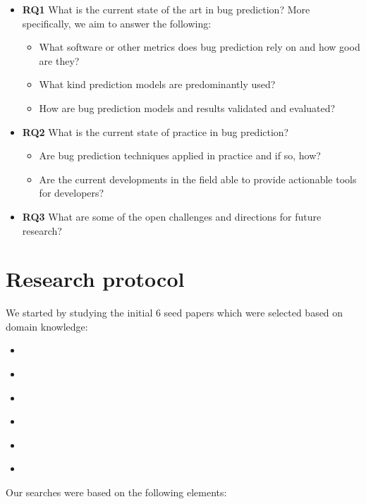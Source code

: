 \documentclass[]{book}
\providecommand{\tightlist}{%
  \setlength{\itemsep}{0pt}\setlength{\parskip}{0pt}}
\begin{document}
\begin{itemize}
\tightlist
\item
  \textbf{RQ1} What is the current state of the art in bug prediction?
  More specifically, we aim to answer the following:

  \begin{itemize}
  \tightlist
  \item
    What software or other metrics does bug prediction rely on and how
    good are they?
  \item
    What kind prediction models are predominantly used?
  \item
    How are bug prediction models and results validated and evaluated?
  \end{itemize}
\item
  \textbf{RQ2} What is the current state of practice in bug prediction?

  \begin{itemize}
  \tightlist
  \item
    Are bug prediction techniques applied in practice and if so, how?
  \item
    Are the current developments in the field able to provide actionable
    tools for developers?
  \end{itemize}
\item
  \textbf{RQ3} What are some of the open challenges and directions for
  future research?
\end{itemize}

\section{Research protocol}\label{research-protocol-2}

We started by studying the initial 6 seed papers which were selected
based on domain knowledge:

\begin{itemize}
\tightlist
\item
  \citet{Gyimothy2005}
\item
  \citet{Catal2009review}
\item
  \citet{Arisholm2010}
\item
  \citet{DAmbros2010}
\item
  \citet{Hall2012}
\item
  \citet{Lewis2013}
\end{itemize}

Our searches were based on the following elements:
\end{document}
